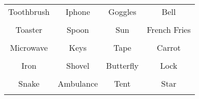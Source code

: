 \documentclass[12pt,a4paper]{article}
\begin{document}
\thispagestyle{empty}
\begin{table}[]
\centering
\Huge
\begin{tabular}{cccc}
 Toothbrush& Iphone& Goggles& Bell\\  & & & \\
 Toaster& Spoon& Sun& French Fries\\  & & & \\
 Microwave& Keys& Tape& Carrot\\  & & & \\
 Iron& Shovel& Butterfly& Lock\\  & & & \\
 Snake& Ambulance& Tent& Star\\  & & & \\
\end{tabular}
\end{table}
\end{document}
